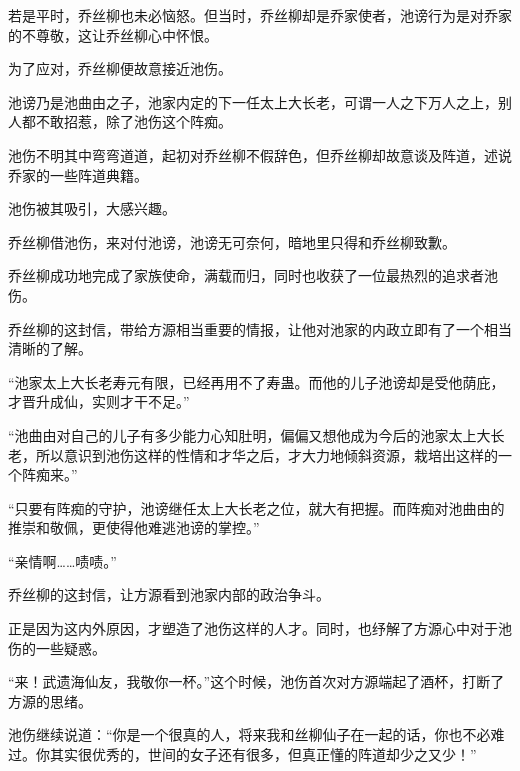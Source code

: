 \begin{this_body}
若是平时，乔丝柳也未必恼怒。但当时，乔丝柳却是乔家使者，池谤行为是对乔家的不尊敬，这让乔丝柳心中怀恨。

为了应对，乔丝柳便故意接近池伤。

池谤乃是池曲由之子，池家内定的下一任太上大长老，可谓一人之下万人之上，别人都不敢招惹，除了池伤这个阵痴。

池伤不明其中弯弯道道，起初对乔丝柳不假辞色，但乔丝柳却故意谈及阵道，述说乔家的一些阵道典籍。

池伤被其吸引，大感兴趣。

乔丝柳借池伤，来对付池谤，池谤无可奈何，暗地里只得和乔丝柳致歉。

乔丝柳成功地完成了家族使命，满载而归，同时也收获了一位最热烈的追求者池伤。

乔丝柳的这封信，带给方源相当重要的情报，让他对池家的内政立即有了一个相当清晰的了解。

“池家太上大长老寿元有限，已经再用不了寿蛊。而他的儿子池谤却是受他荫庇，才晋升成仙，实则才干不足。”

“池曲由对自己的儿子有多少能力心知肚明，偏偏又想他成为今后的池家太上大长老，所以意识到池伤这样的性情和才华之后，才大力地倾斜资源，栽培出这样的一个阵痴来。”

“只要有阵痴的守护，池谤继任太上大长老之位，就大有把握。而阵痴对池曲由的推崇和敬佩，更使得他难逃池谤的掌控。”

“亲情啊……啧啧。”

乔丝柳的这封信，让方源看到池家内部的政治争斗。

正是因为这内外原因，才塑造了池伤这样的人才。同时，也纾解了方源心中对于池伤的一些疑惑。

“来！武遗海仙友，我敬你一杯。”这个时候，池伤首次对方源端起了酒杯，打断了方源的思绪。

池伤继续说道：“你是一个很真的人，将来我和丝柳仙子在一起的话，你也不必难过。你其实很优秀的，世间的女子还有很多，但真正懂的阵道却少之又少！”

\end{this_body}

